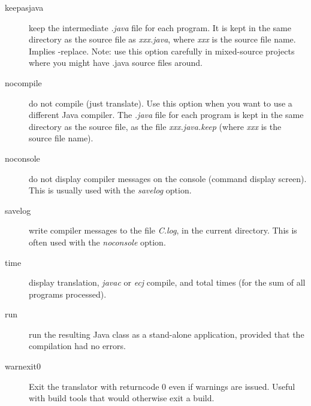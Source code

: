 \begin{description}
\item[keepasjava]
keep the intermediate \emph{.java} file for each program.  It is kept in
the same directory as the \nr{} source file as \emph{xxx.java},
where \emph{xxx} is the source file name.  Implies -replace. Note: use this option carefully in mixed-source projects where you might have .java source files around.
\item[nocompile]
do not compile (just translate).  Use this option when you want to use a
different Java compiler.  The \emph{.java} file for each program is kept
in the same directory as the \nr{} source file, as the
file \emph{xxx.java.keep} (where \emph{xxx} is the source file name).
\item[noconsole]
do not display compiler messages on the console (command display
screen).  This is usually used with the \emph{savelog} option.
\item[savelog]
write compiler messages to the file \emph{\nr{}C.log}, in the current
directory.
This is often used with the \emph{noconsole} option.
\item[time]
display translation, \emph{javac} or \emph{ecj} compile, and total times (for the sum
of all programs processed).
\item[run]
run the resulting Java class as a stand-alone application, provided that
the compilation had no errors.
\item[warnexit0]
Exit the translator with returncode 0 even if warnings are issued. Useful with build tools that would otherwise exit a build.
\end{description}
